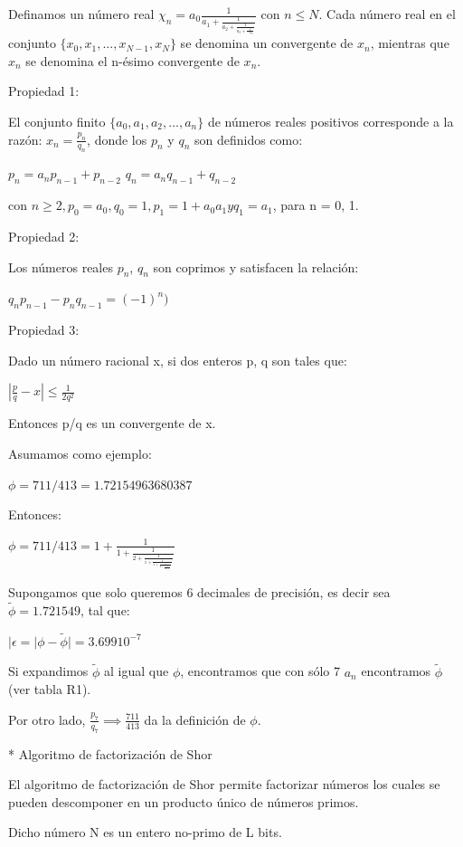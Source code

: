 \documentclass[11pt, spanish]{report}
\begin{document}
Definamos un número real $\chi_n = a_0 \frac{1}{a_1 + \frac{1}{a_2 + \frac{1}{a_3 + \frac{1}{... a_n}}}}$ con $n \leq N$. Cada número real en el conjunto $\{x_0,x_1,...,x_{N-1},x_N\}$ se denomina un convergente de $x_n$, mientras que $x_n$ se denomina el n-ésimo convergente de $x_n$.

Propiedad 1:

El conjunto finito $\{a_0,a_1,a_2,...,a_n\}$ de números reales positivos corresponde a la razón: $x_n = \frac{p_n}{q_n}$, donde los $p_n$ y $q_n$ son definidos como:

$p_n = a_n p_{n-1} + p_{n-2}$
$q_n = a_n q_{n-1} + q_{n-2}$

con $n \geq 2, p_0 = a_0, q_0 = 1, p_1 = 1 + a_0 a_1 y q_1 = a_1$, para n = 0, 1.

Propiedad 2:

Los números reales $p_n$, $q_n$ son coprimos y satisfacen la relación:

$q_n p_{n-1} - p_n q_{n-1} = (-1)^n)$

Propiedad 3:

Dado un número racional x, si dos enteros p, q son tales que:

$|\frac{p}{q} - x| \leq \frac{1}{2q^2}$

Entonces p/q es un convergente de x.

Asumamos como ejemplo:

$\phi = 711/413 = 1.72154963680387$

Entonces:

$\phi = 711/413 = 1 + \frac{1}{1 + \frac{1}{2 + \frac{1}{1 + \frac{1}{1 + \frac{1}{2 + \frac{1}{4 + \frac{1}{5}}}}}}}$

Supongamos que solo queremos 6 decimales de precisión, es decir sea $\tilde{\phi} = 1.721549$, tal que:

$|\epsilon = |\phi - \tilde{\phi}| = 3.699 10^{-7}$

Si expandimos $\tilde{\phi}$ al igual que $\phi$, encontramos que con sólo 7 $a_n$ encontramos $\tilde{\phi}$ (ver tabla R1).

Por otro lado, $\frac{p_7}{q_7} \implies \frac{711}{413}$ da la definición de $\phi$.

* Algoritmo de factorización de Shor

El algoritmo de factorización de Shor permite factorizar números los cuales se pueden descomponer en un producto único de números primos.

Dicho número N es un entero no-primo de L bits.
\end{document}
